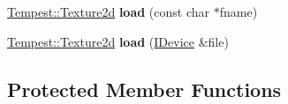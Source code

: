\begin{DoxyCompactItemize}
\item 
\hypertarget{class_tempest_1_1_texture_holder_aee6d82a4b08357c959a306afa1532690}{\hyperlink{class_tempest_1_1_texture2d}{Tempest\+::\+Texture2d} {\bfseries load} (const char $\ast$fname)}\label{class_tempest_1_1_texture_holder_aee6d82a4b08357c959a306afa1532690}

\item 
\hypertarget{class_tempest_1_1_texture_holder_a09bf88bd8e84079b93bfc54ff91974e2}{\hyperlink{class_tempest_1_1_texture2d}{Tempest\+::\+Texture2d} {\bfseries load} (\hyperlink{class_tempest_1_1_i_device}{I\+Device} \&file)}\label{class_tempest_1_1_texture_holder_a09bf88bd8e84079b93bfc54ff91974e2}

\end{DoxyCompactItemize}
\subsection*{Protected Member Functions}
